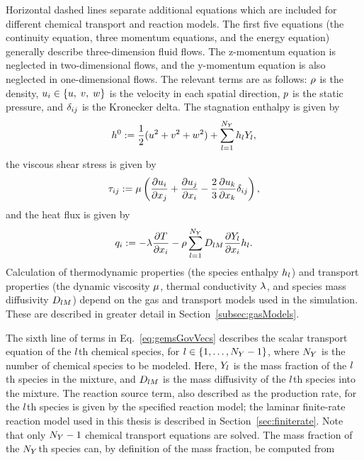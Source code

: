 Horizontal dashed lines separate additional equations which are included for different chemical transport and reaction models. The first five equations (the continuity equation, three momentum equations, and the energy equation) generally describe three-dimension fluid flows. The z-momentum equation is neglected in two-dimensional flows, and the y-momentum equation is also neglected in one-dimensional flows. The relevant terms are as follows: $\rho$ is the density, $u_{i} \in \{u, \; v, \; w\}$ is the velocity in each spatial direction, $p$ is the static pressure, and $\delta_{i j}$ is the Kronecker delta. The stagnation enthalpy is given by
\begin{equation}\label{eq:stagEnth}
	h^0 := \frac{1}{2} (u^2 + v^2 + w^2) + \sum_{l = 1}^{N_Y} h_{l} Y_{l},
\end{equation}
the viscous shear stress is given by
\begin{equation}\label{eq:shearStress}
	\tau_{i j} := \mu \left( \frac{\partial u_{i}}{\partial x_{j}} + \frac{\partial u_{j}}{\partial x_{i}} - \frac{2}{3} \frac{\partial u_{k}}{\partial x_{k}} \delta_{i j} \right),
\end{equation}
and the heat flux is given by
\begin{equation}\label{eq:heatFlux}
	q_{i} := -\lambda \frac{\partial T}{\partial x_{i}} - \rho \sum_{l = 1}^{N_Y} D_{l M} \frac{\partial Y_{l}}{\partial x_{i}} h_{l}.
\end{equation}
Calculation of thermodynamic properties (the species enthalpy $h_{l}$) and transport properties (the dynamic viscosity $\mu$, thermal conductivity $\lambda$, and species mass diffusivity $D_{l M}$) depend on the gas and transport models used in the simulation. These are described in greater detail in Section~\ref{subsec:gasModels}.

The sixth line of terms in Eq.~\ref{eq:gemsGovVecs} describes the scalar transport equation of the $l$th chemical species, for $l \in \{1, \hdots, N_Y - 1\}$, where $N_Y$ is the number of chemical species to be modeled. Here, $Y_{l}$ is the mass fraction of the $l$th species in the mixture, and $D_{l M}$ is the mass diffusivity of the $l$th species into the mixture. The reaction source term, also described as the production rate, for the $l$th species is given by the specified reaction model; the laminar finite-rate reaction model used in this thesis is described in Section~\ref{sec:finiterate}. Note that only $N_Y - 1$ chemical transport equations are solved. The mass fraction of the $N_Y$th species can, by definition of the mass fraction, be computed from

